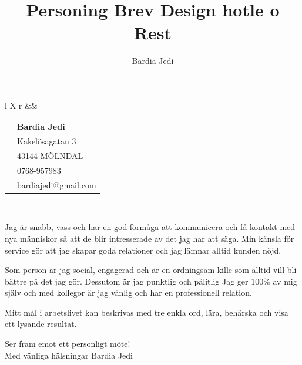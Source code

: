 \documentclass[12pt,a4paper]{article}
\author{Bardia Jedi}
\title{Personing Brev Design hotle o Rest}
\begin{document}

		

	
	
	\begin{tabularx}{ \textwidth}{ l X r  }				
  		 			&& 
  			\begin{tabular}{ r  l }
					& \textbf{Bardia Jedi}\\
					& Kakelösagatan 3\\
					& 43144 MÖLNDAL\\			
  					& 0768-957983\\
  					& bardiajedi@gmail.com \\
 
			\end{tabular}\\
	\end{tabularx}
	\vspace{12pt}


	\begin{flushleft}
	\vspace{24pt}
	 	Jag är snabb, vass och har en god förmåga att kommunicera och få kontakt med nya människor så att de blir intresserade av det jag har att säga. Min känsla för service gör att jag skapar goda relationer och jag lämnar alltid kunden nöjd.
	\end{flushleft}
		
	
	\begin{flushleft}
			
			Som person är jag social, engagerad och är en ordningsam kille som alltid vill bli	bättre på det jag gör. 
			Dessutom är jag punktlig och pålitlig 			
			Jag ger 100\% 		
			av mig själv och med kollegor är jag vänlig och 
			har en professionell relation.


			\vspace{12pt}

		Mitt mål i arbetslivet kan beskrivas med tre enkla ord, lära, behärska och visa ett lysande resultat.
		
	
		\vspace{24pt}
		Ser fram emot ett personligt möte!\\
		Med vänliga hälsningar Bardia Jedi
	\end{flushleft}
	
	
	
\end{document}
